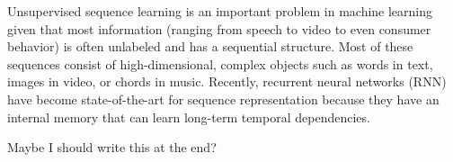 Unsupervised sequence learning is an important problem in machine learning given that most information (ranging from speech to video to even consumer behavior) is often unlabeled and has a sequential structure. Most of these sequences consist of high-dimensional, complex objects such as words in text, images in video, or chords in music. Recently, recurrent neural networks (RNN) have become state-of-the-art for sequence representation because they have an internal memory that can learn long-term temporal dependencies. 

Maybe I should write this at the end?
